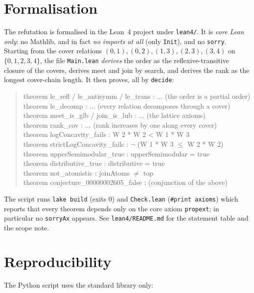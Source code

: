\documentclass[11pt]{article}
\theoremstyle{definition}
\theoremstyle{remark}
\begin{document}
\section{Formalisation}

The refutation is formalised in the Lean~4 project under \texttt{lean4/}. It is
\emph{core Lean only}: no Mathlib, and in fact \emph{no imports at all} (only
\texttt{Init}), and no \texttt{sorry}. Starting from the cover relations
$(0,1),(0,2),(1,3),(2,3),(3,4)$ on $\{0,1,2,3,4\}$, the file \texttt{Main.lean}
\emph{derives} the order as the reflexive-transitive closure of the covers,
derives meet and join by search, and derives the rank as the longest
cover-chain length. It then proves, all by \texttt{decide}:

\begin{quote}\ttfamily\raggedright
theorem le\_refl / le\_antisymm / le\_trans : ... (the order is a partial order)\\
theorem le\_decomp : ... (every relation decomposes through a cover)\\
theorem meet\_is\_glb / join\_is\_lub : ... (the lattice axioms)\\
theorem rank\_cov : ... (rank increases by one along every cover)\\
theorem logConcavity\_fails : W 2 * W 2 < W 1 * W 3\\
theorem strictLogConcavity\_fails : \(\neg\) (W 1 * W 3 \(\le\) W 2 * W 2)\\
theorem upperSemimodular\_true : upperSemimodular = true\\
theorem distributive\_true : distributive = true\\
theorem not\_atomistic : joinAtoms \(\ne\) top\\
theorem conjecture\_00000002605\_false : (conjunction of the above)
\end{quote}

The script runs \texttt{lake build} (exits $0$) and \texttt{Check.lean}
(\texttt{\#print axioms}) which reports that every theorem depends only on the
core axiom \texttt{propext}; in particular no \texttt{sorryAx} appears. See
\texttt{lean4/README.md} for the statement table and the scope note.

\section{Reproducibility}

The Python script uses the standard library only:
\end{document}
